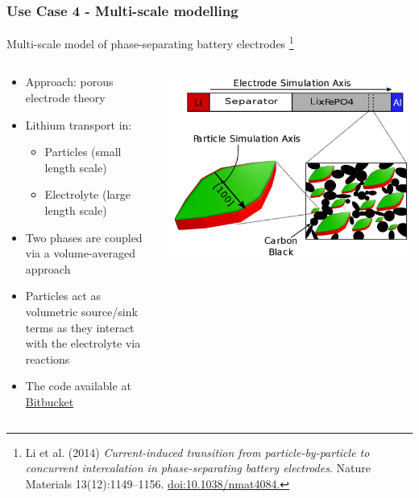 \documentclass[compress,newPxFont,sthlmFooter]{beamer}
\begin{document}
\begin{frame}[plain]
\frametitle{Use Case 4 - Multi-scale modelling}
    \begin{center}
        \alert{Multi-scale model of phase-separating battery electrodes}
        \footnote{\tiny{Li et al. (2014) \textit{Current-induced transition
                    from particle-by-particle to concurrent intercalation in phase-separating battery electrodes}.
                    Nature Materials 13(12):1149–1156. \href{https://doi.org/10.1038/nmat4084}{doi:10.1038/nmat4084.}}
                }
     \end{center}  
    \begin{columns}[c]
      \begin{column}{0.6\textwidth}
        {\small
         \begin{itemize}
            \item Approach: \alert{porous electrode theory}
            \item Lithium transport in:
            \begin{itemize}
                \item Particles (small length scale)
                \item Electrolyte (large length scale)
            \end{itemize}
            \item Two phases are coupled via a volume-averaged approach
            \item Particles act as volumetric source/sink terms as they interact with the
                  electrolyte via reactions
            \item The code available at \alert{\href{https://bitbucket.org/bazantgroup/mpet}{Bitbucket}}
        \end{itemize}
        }
      \end{column}
      
      \begin{column}{0.4\textwidth}
        \begin{center}
          \includegraphics[align=c, width=\textwidth]{multi_scale.png}
        \end{center}
      \end{column}
    \end{columns}
\end{frame}
\end{document}
